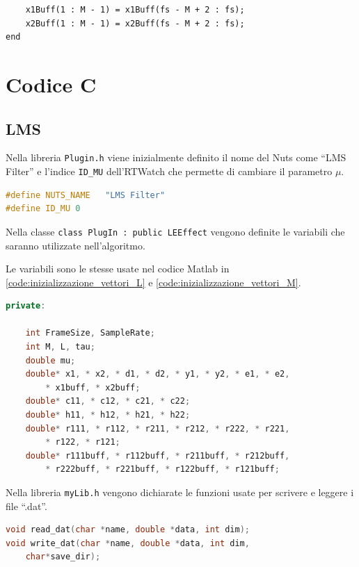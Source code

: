 \documentclass[12pt,a4paper,titlepage]{article}
\begin{document}
\begin{lstlisting}[label=code:ols6, caption=Aggiornamento del buffer di ingresso, captionpos=b, language=matlabfloz]
    % first M - 1 values of the new vector must be the last ones of the previous array
    x1Buff(1 : M - 1) = x1Buff(fs - M + 2 : fs); 
    x2Buff(1 : M - 1) = x2Buff(fs - M + 2 : fs); 
end
\end{lstlisting}  

\clearpage

\section{Codice C}
\label{sec:codice_c}
\subsection{LMS}
\label{sec:codice_c_lms}
Nella libreria \texttt{Plugin.h} viene inizialmente definito il nome del Nuts come ``LMS Filter'' e l’indice \texttt{ID\_MU} dell'RTWatch che permette di cambiare
il parametro $\mu$.

\begin{lstlisting}[language=cpp, label = dichiarazione_costanti_lms, caption = Dichiarazione delle costanti in \texttt{Plugin.h}, captionpos = b]
#define NUTS_NAME	"LMS Filter"
#define ID_MU 0 
\end{lstlisting}
Nella classe \texttt{class PlugIn :	public LEEffect} vengono definite le variabili che saranno utilizzate nell'algoritmo.

Le variabili sono le stesse usate nel codice Matlab in \ref{code:inizializzazione_vettori_L} e \ref{code:inizializzazione_vettori_M}.
\begin{lstlisting}[language=cpp, label=code:variabili_lms, caption = Dichiarazione delle variabili in \texttt{Plugin.h}, breaklines = false, captionpos = b]
private:

	int FrameSize, SampleRate;
	int M, L, tau;
	double mu;
	double* x1, * x2, * d1, * d2, * y1, * y2, * e1, * e2,
		* x1buff, * x2buff;
	double* c11, * c12, * c21, * c22;
	double* h11, * h12, * h21, * h22;
	double* r111, * r112, * r211, * r212, * r222, * r221, 
		* r122, * r121;
	double* r111buff, * r112buff, * r211buff, * r212buff, 
		* r222buff, * r221buff, * r122buff, * r121buff;
\end{lstlisting}
Nella libreria \texttt{myLib.h} vengono dichiarate le funzioni usate per scrivere e leggere i file ``.dat''.

\begin{lstlisting}[language=cpp, label=code:myLib.h, caption = Libreria \texttt{myLib.h}, breaklines = false, captionpos = b]
void read_dat(char *name, double *data, int dim);
void write_dat(char *name, double *data, int dim, 
	char*save_dir);
\end{lstlisting}
\end{document}
